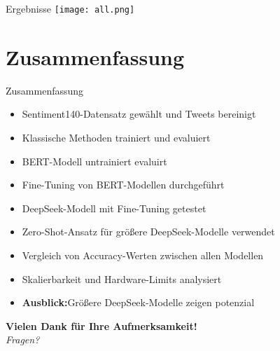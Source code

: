 \documentclass[aspectratio=169]{beamer} %
\begin{document}
\begin{frame}{Ergebnisse}
    \centering
    \texttt{[image: all.png]}
\end{frame}

\section{Zusammenfassung}

\begin{frame}{Zusammenfassung}
  \normalsize
  \begin{itemize}
      \item Sentiment140-Datensatz gewählt und Tweets bereinigt
      \item Klassische Methoden trainiert und evaluiert
      \item BERT-Modell untrainiert evaluirt
      \item Fine-Tuning von BERT-Modellen durchgeführt
      \item DeepSeek-Modell mit Fine-Tuning getestet
      \item Zero-Shot-Ansatz für größere DeepSeek-Modelle verwendet
      \item Vergleich von Accuracy-Werten zwischen allen Modellen
      \item Skalierbarkeit und Hardware-Limits analysiert
      \item \textbf{Ausblick:}Größere DeepSeek-Modelle zeigen potenzial
  \end{itemize}

  \vspace{0.5cm}
  \centering
  \pause
  {\large \textbf{Vielen Dank für Ihre Aufmerksamkeit!}} \\[0.1cm]
  \textit{Fragen?}
\end{frame}
\end{document}
